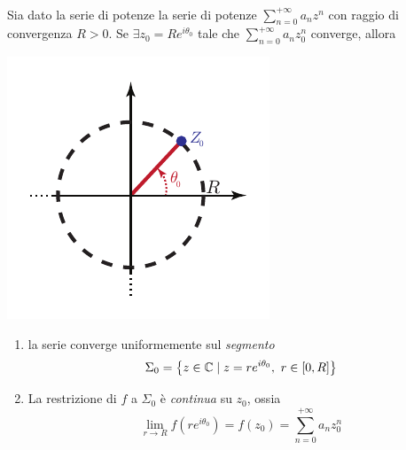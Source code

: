 \begin{theorema}~{}\\
	Sia dato la serie di potenze la serie di potenze $\displaystyle\sum_{n=0}^{+\infty}a_nz^n$ con raggio di convergenza $R>0$. Se $\exists z_0=Re^{i\theta_0}$ tale che $\displaystyle\sum_{n=0}^{+\infty}a_nz_0^n$ converge, allora\\
	\begin{minipage}{0.39\textwidth}
		\includegraphics[trim=0cm 0cm 0cm 0cm, clip, scale=1]{images/discoconvergenzaabel.pdf}
	\end{minipage}\hspace{-12mm}
	\begin{minipage}{0.65\textwidth}
		\begin{enumerate}
			\item la serie converge uniformemente sul \textit{segmento}
			\begin{equation}
				\Sigma_0=\left\{z\in\mathbb{C}\mid z=re^{i\theta_0},\ r\in\left[0,R\right]\right\}
			\end{equation}
			\item La restrizione di $f$ a $\Sigma_0$ è \textit{continua} su $z_0$, ossia
			\begin{equation}
				\lim_{r\to R}f\left(re^{i\theta_0}\right)=f\left(z_0\right)=\sum_{n=0}^{+\infty}a_nz_0^n
			\end{equation}
		\end{enumerate}
	\end{minipage}
\end{theorema}
